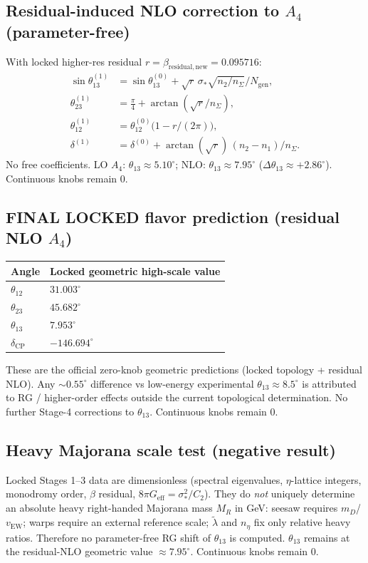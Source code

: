 \documentclass{article}
\begin{document}
\subsection{Residual-induced NLO correction to $A_4$ (parameter-free)}
With locked higher-res residual $r=\beta_{\mathrm{residual,new}}=0.095716$:
\begin{align}
\sin\theta_{13}^{(1)}
  &= \sin\theta_{13}^{(0)} + \sqrt{r}\,\sigma_*\sqrt{n_2/n_\Sigma}/N_{\mathrm{gen}}, \\
\theta_{23}^{(1)}
  &= \tfrac{\pi}{4} + \arctan(\sqrt{r}/n_\Sigma), \\
\theta_{12}^{(1)}
  &= \theta_{12}^{(0)}\bigl(1 - r/(2\pi)\bigr), \\
\delta^{(1)}
  &= \delta^{(0)} + \arctan(\sqrt{r})\,(n_2-n_1)/n_\Sigma.
\end{align}
No free coefficients. LO $A_4$: $\theta_{13}\approx 5.10^\circ$;
NLO: $\theta_{13}\approx 7.95^\circ$ ($\Delta\theta_{13}\approx +2.86^\circ$).
Continuous knobs remain 0.

\subsection{FINAL LOCKED flavor prediction (residual NLO $A_4$)}
\begin{center}
\begin{tabular}{ll}
\hline
Angle & Locked geometric high-scale value \\
\hline
$\theta_{12}$ & $31.003^\circ$ \\
$\theta_{23}$ & $45.682^\circ$ \\
$\theta_{13}$ & $7.953^\circ$ \\
$\delta_{\mathrm{CP}}$ & $-146.694^\circ$ \\
\hline
\end{tabular}
\end{center}
These are the official zero-knob geometric predictions (locked topology + residual NLO).
Any $\sim 0.55^\circ$ difference vs low-energy experimental $\theta_{13}\approx 8.5^\circ$
is attributed to RG / higher-order effects outside the current topological determination.
No further Stage-4 corrections to $\theta_{13}$. Continuous knobs remain 0.

\subsection{Heavy Majorana scale test (negative result)}
Locked Stages 1--3 data are dimensionless (spectral eigenvalues, $\eta$-lattice
integers, monodromy order, $\beta$ residual, $8\pi G_{\mathrm{eff}}=\sigma_*^2/C_2$).
They do \emph{not} uniquely determine an absolute heavy right-handed Majorana
mass $M_R$ in GeV: seesaw requires $m_D$/$v_{\mathrm{EW}}$; warps require an
external reference scale; $\tilde\lambda$ and $n_\eta$ fix only relative heavy
ratios. Therefore no parameter-free RG shift of $\theta_{13}$ is computed.
$\theta_{13}$ remains at the residual-NLO geometric value $\approx 7.95^\circ$.
Continuous knobs remain 0.
\end{document}
